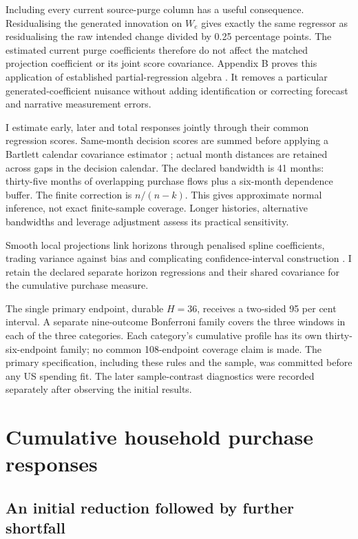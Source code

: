 \documentclass[11pt,a4paper]{article}
\begin{document}
Including every current source-purge column has a useful consequence. Residualising the generated innovation on $W_e$ gives exactly the same regressor as residualising the raw intended change divided by 0.25 percentage points. The estimated current purge coefficients therefore do not affect the matched projection coefficient or its joint score covariance. Appendix B proves this application of established partial-regression algebra \citep{Ding2021}. It removes a particular generated-coefficient nuisance without adding identification or correcting forecast and narrative measurement errors.

I estimate early, later and total responses jointly through their common regression scores. Same-month decision scores are summed before applying a Bartlett calendar covariance estimator \citep{NeweyWest1987}; actual month distances are retained across gaps in the decision calendar. The declared bandwidth is 41 months: thirty-five months of overlapping purchase flows plus a six-month dependence buffer. The finite correction is $n/(n-k)$. This gives approximate normal inference, not exact finite-sample coverage. Longer histories, alternative bandwidths and leverage adjustment assess its practical sensitivity.

Smooth local projections link horizons through penalised spline coefficients, trading variance against bias and complicating confidence-interval construction \citep{BarnichonBrownlees2019}. I retain the declared separate horizon regressions and their shared covariance for the cumulative purchase measure.

The single primary endpoint, durable $H=36$, receives a two-sided 95 per cent interval. A separate nine-outcome Bonferroni family covers the three windows in each of the three categories. Each category's cumulative profile has its own thirty-six-endpoint family; no common 108-endpoint coverage claim is made. The primary specification, including these rules and the sample, was committed before any US spending fit. The later sample-contrast diagnostics were recorded separately after observing the initial results.

\section{Cumulative household purchase responses}

\subsection{An initial reduction followed by further shortfall}
\end{document}
